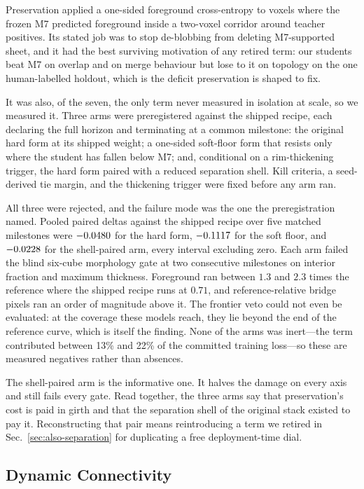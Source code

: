 Preservation applied a one-sided foreground cross-entropy to voxels where the
frozen M7 predicted foreground inside a two-voxel corridor around teacher
positives.
Its stated job was to stop de-blobbing from deleting M7-supported sheet, and it
had the best surviving motivation of any retired term: our students beat M7 on
overlap and on merge behaviour but lose to it on topology on the one
human-labelled holdout, which is the deficit preservation is shaped to fix.

It was also, of the seven, the only term never measured in isolation at scale,
so we measured it.
Three arms were preregistered against the shipped recipe, each declaring the
full horizon and terminating at a common milestone: the original hard form at
its shipped weight; a one-sided soft-floor form that resists only where the
student has fallen below M7; and, conditional on a rim-thickening trigger, the
hard form paired with a reduced separation shell.
Kill criteria, a seed-derived tie margin, and the thickening trigger were fixed
before any arm ran.

All three were rejected, and the failure mode was the one the preregistration
named.
Pooled paired deltas against the shipped recipe over five matched milestones
were $-0.0480$ for the hard form, $-0.1117$ for the soft floor, and
$-0.0228$ for the shell-paired arm, every interval excluding zero.
Each arm failed the blind six-cube morphology gate at two consecutive
milestones on interior fraction and maximum thickness.
Foreground ran between $1.3$ and $2.3$ times the reference where the shipped
recipe runs at $0.71$, and reference-relative bridge pixels ran an order of
magnitude above it.
The frontier veto could not even be evaluated: at the coverage these models
reach, they lie beyond the end of the reference curve, which is itself the
finding.
None of the arms was inert---the term contributed between 13\% and 22\% of the
committed training loss---so these are measured negatives rather than absences.

The shell-paired arm is the informative one.
It halves the damage on every axis and still fails every gate.
Read together, the three arms say that preservation's cost is paid in girth and
that the separation shell of the original stack existed to pay it.
Reconstructing that pair means reintroducing a term we retired in
Sec.~\ref{sec:also-separation} for duplicating a free deployment-time dial.

\subsection{Dynamic Connectivity}
\label{sec:also-connectivity}

